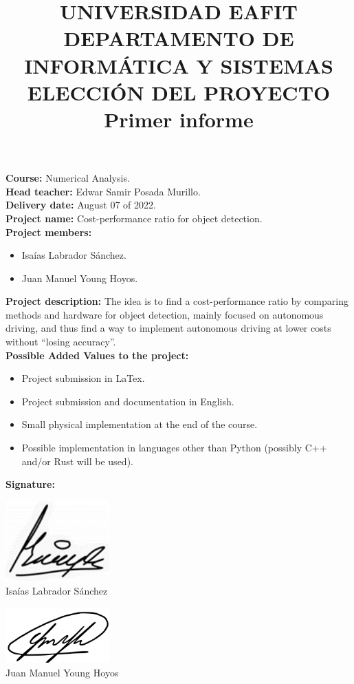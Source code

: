 \documentclass[11pt, letterpaper, twoside]{article}
\title{\vspace{-4.5cm}
UNIVERSIDAD EAFIT\\
DEPARTAMENTO DE INFORMÁTICA Y SISTEMAS\\
ELECCIÓN DEL PROYECTO\\


\large Primer informe
}
\begin{document}
\maketitle

\noindent\textbf{Course:} Numerical Analysis.\\
\textbf{Head teacher:} Edwar Samir Posada Murillo.\\
\textbf{Delivery date:} August 07 of 2022.\\
\textbf{Project name:} Cost-performance ratio for object detection.\\
\textbf{Project members:}
\begin{itemize}
    \item Isaías Labrador Sánchez.
    \item Juan Manuel Young Hoyos.
\end{itemize}
\textbf{Project description:} The idea is to find a cost-performance ratio by
comparing methods and hardware for object detection, mainly focused on
autonomous driving, and thus find a way to implement autonomous driving at lower
costs without \textquotedblleft losing accuracy\textquotedblright.\\
\textbf{Possible Added Values to the project:} 
\begin{itemize}
    \item Project submission in LaTex.
    \item Project submission and documentation in English.
    \item Small physical implementation at the end of the course.
    \item Possible implementation in languages other than Python (possibly C++
    and/or Rust will be used).
\end{itemize}
\textbf{Signature:}

\vfill  %
\noindent \parbox[t]{0.5\linewidth}{%
    \underline{
        \includegraphics[width=0.3\textwidth]{01}
    }\\
    Isaías Labrador Sánchez \\
    \vspace{2cm} %
} 
\parbox[t]{0.45\linewidth}{%
    \underline{
        \includegraphics[width=0.3\textwidth]{00}
    }\\
    Juan Manuel Young Hoyos \\
}
\end{document}
